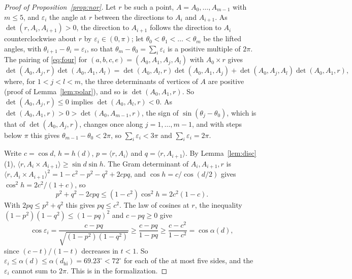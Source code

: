 \documentclass[12pt]{amsart}
\theoremstyle{definition}
\theoremstyle{plain}
\theoremstyle{definition}
\newcommand{\dhi}{d_{\mathrm{hi}}}
\begin{document}
\begin{proof}[Proof of Proposition~\ref{prop:nor}]
Let $r$ be such a point, $A=A_0,\dots,A_{m-1}$ with $m\le5$, and $\varepsilon_i$ the angle at $r$ between the directions to $A_i$ and $A_{i+1}$. As $\det(r,A_i,A_{i+1})>0$, the direction to $A_{i+1}$ follows the direction to $A_i$ counterclockwise about $r$ by $\varepsilon_i\in(0,\pi)$; let $\theta_0<\theta_1<\dots<\theta_m$ be the lifted angles, with $\theta_{i+1}-\theta_i=\varepsilon_i$, so that $\theta_m-\theta_0=\sum_i\varepsilon_i$ is a positive multiple of $2\pi$. The pairing of \eqref{eq:four} for $(a,b,c,e)=(A_0,A_1,A_j,A_l)$ with $A_0\times r$ gives
\[
\det(A_0,A_j,r)\det(A_0,A_1,A_l)=\det(A_0,A_l,r)\det(A_0,A_1,A_j)+\det(A_0,A_j,A_l)\det(A_0,A_1,r),
\]
where, for $1<j<l<m$, the three determinants of vertices of $A$ are positive (proof of Lemma~\ref{lem:polar}), and so is $\det(A_0,A_1,r)$. So $\det(A_0,A_j,r)\le0$ implies $\det(A_0,A_l,r)<0$. As $\det(A_0,A_1,r)>0>\det(A_0,A_{m-1},r)$, the sign of $\sin(\theta_j-\theta_0)$, which is that of $\det(A_0,A_j,r)$, changes once along $j=1,\dots,m-1$, and with steps below $\pi$ this gives $\theta_{m-1}-\theta_0<2\pi$, so $\sum_i\varepsilon_i<3\pi$ and $\sum_i\varepsilon_i=2\pi$.

Write $c=\cos d$, $h=h(d)$, $p=\langle r,A_i\rangle$ and $q=\langle r,A_{i+1}\rangle$. By Lemma~\ref{lem:disc}(1), $\langle r,A_i\times A_{i+1}\rangle\ge\sin d\sin h$. The Gram determinant of $A_i,A_{i+1},r$ is $\langle r,A_i\times A_{i+1}\rangle^2=1-c^2-p^2-q^2+2cpq$, and $\cos h=c/\cos(d/2)$ gives $\cos^2h=2c^2/(1+c)$, so
\[
p^2+q^2-2cpq\le(1-c^2)\cos^2h=2c^2(1-c).
\]
With $2pq\le p^2+q^2$ this gives $pq\le c^2$. The law of cosines at $r$, the inequality $(1-p^2)(1-q^2)\le(1-pq)^2$ and $c-pq\ge0$ give
\[
\cos\varepsilon_i=\frac{c-pq}{\sqrt{(1-p^2)(1-q^2)}}\ge\frac{c-pq}{1-pq}\ge\frac{c-c^2}{1-c^2}=\cos\alpha(d),
\]
since $(c-t)/(1-t)$ decreases in $t<1$. So $\varepsilon_i\le\alpha(d)\le\alpha(\dhi)=69.23^\circ<72^\circ$ for each of the at most five sides, and the $\varepsilon_i$ cannot sum to $2\pi$. This is  in the formalization.
\end{proof}
\end{document}
